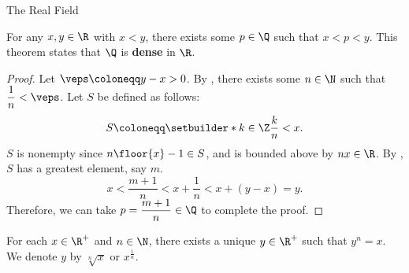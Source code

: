 \begin{section}{The Real Field}
\bigskip

\begin{theorem} \label{thm:QIsDenseInR}
    For any $x, y \in \R$ with $x < y$, there exists some $p \in \Q$ such that $x < p < y$.
    This theorem states that $\Q$ is \textbf{dense} in $\R$.
\end{theorem}

\begin{proof}
    Let $\veps \coloneqq y - x > 0$. By , there exists some $n \in \N$
    such that $\dfrac{1}{n} < \veps$. Let $S$ be defined as follows:
    \[
    S \coloneqq \setbuilder*{k \in \Z}{\dfrac{k}{n} < x}.
    \]
    $S$ is nonempty since $n\floor{x} - 1 \in S$, and is bounded above by $nx \in \R$.
    By , $S$ has a greatest element, say $m$.
    \[
    x < \frac{m + 1}{n} < x + \frac{1}{n} < x + (y - x) = y.
    \]
    Therefore, we can take $p = \dfrac{m + 1}{n} \in \Q$ to complete the proof.
\end{proof}

\bigskip

\begin{theorem} \label{thm:ExistenceOfNthRoots}
    For each $x \in \R^{+}$ and $n \in \N$, there exists a unique $y \in \R^{+}$ such that
    $y^{n} = x$. We denote $y$ by $\sqrt[n]{x}$ or $x^{\frac{1}{n}}$.
\end{theorem}


\end{section}
